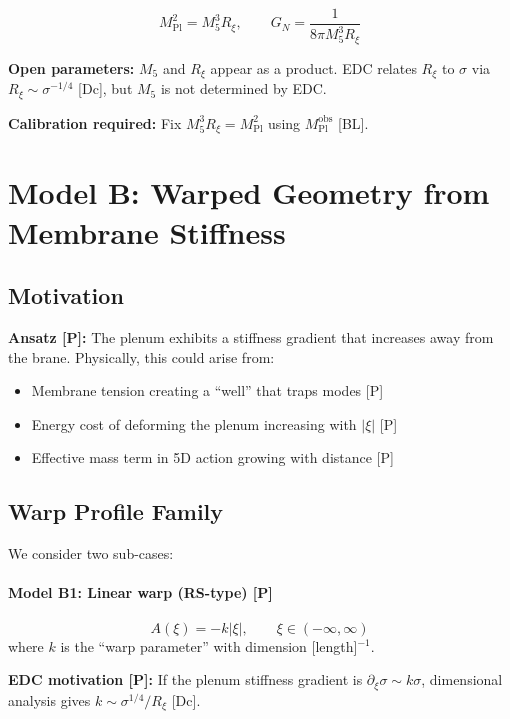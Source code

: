 \documentclass[11pt,a4paper]{article}
\newcommand{\Mpl}{M_{\text{Pl}}}
\newcommand{\Mfive}{M_5}
\newcommand{\GN}{G_N}
\newcommand{\Rxi}{R_\xi}
\begin{document}
\begin{equation}
\label{eq:model-a-GN}
\Mpl^2 = \Mfive^3 \Rxi,
\qquad
\GN = \frac{1}{8\pi \Mfive^3 \Rxi}
\end{equation}

\textbf{Open parameters:} $\Mfive$ and $\Rxi$ appear as a product.
EDC relates $\Rxi$ to $\sigma$ via $\Rxi \sim \sigma^{-1/4}$ [Dc],
but $\Mfive$ is not determined by EDC.

\textbf{Calibration required:} Fix $\Mfive^3 \Rxi = \Mpl^2$ using $\Mpl^{\text{obs}}$ [BL].

\section{Model B: Warped Geometry from Membrane Stiffness}
\label{sec:model-b}

\subsection{Motivation}

\textbf{Ansatz [P]:} The plenum exhibits a stiffness gradient that increases
away from the brane. Physically, this could arise from:
\begin{itemize}
    \item Membrane tension creating a ``well'' that traps modes [P]
    \item Energy cost of deforming the plenum increasing with $|\xi|$ [P]
    \item Effective mass term in 5D action growing with distance [P]
\end{itemize}

\subsection{Warp Profile Family}

We consider two sub-cases:

\paragraph{Model B1: Linear warp (RS-type) [P]}
\begin{equation}
A(\xi) = -k|\xi|, \qquad \xi \in (-\infty, \infty)
\end{equation}
where $k$ is the ``warp parameter'' with dimension [length]$^{-1}$.

\textbf{EDC motivation [P]:} If the plenum stiffness gradient is
$\partial_\xi \sigma \sim k \sigma$, dimensional analysis gives
$k \sim \sigma^{1/4} / \Rxi$ [Dc].
\end{document}
